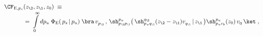 \begin{equation}\begin{aligned}
{} \CF_{{\rm E},p_s} & (z_\2,z_\1,z_0)\;\equiv\;\\[-.5ex]
& =\;
\int\limits_{0}^{\infty}dp_u\;\Phi_{\rm E}(\,p_s\,|\,p_u)
\;\bra\, v_{p_\2}^{}\, ,\,
\sh_{p_\2p_\1}^{p_u}\bigl(\,\sh_{p_uq_\1}^{q_\2}(z_\2-z_\1)v_{q_\1}^{}\,|\,z_\1
\,\bigr)\sh_{p_uc_b}^{p_u}(z_0)
\,v_0^{}\,\ket\;,
\end{aligned}\end{equation}

